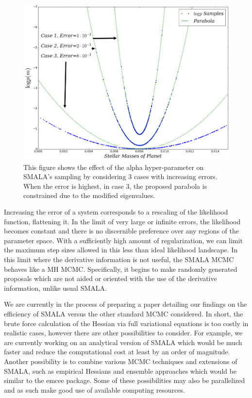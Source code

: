 \begin{figure}
\centering
\includegraphics[width=0.75\hsize]{alpha-1.png}
   \caption{This figure shows the effect of the alpha hyper-parameter on SMALA's sampling by considering 3 cases with increasing errors. When the error is highest, in case 3, the proposed parabola is constrained due to the modified eigenvalues.
}
      \label{alpha}
\end{figure}

Increasing the error of a system corresponds to a rescaling of the likelihood function, flattening it.
In the limit of very large or infinite errors, the likelihood becomes constant and there is no discernible preference over any regions of the parameter space.
With a sufficiently high amount of regularization, we can limit the maximum step sizes allowed in this less than ideal likelihood landscape.
In this limit where the derivative information is not useful, the SMALA MCMC behaves like a MH MCMC.
Specifically, it begins to make randomly generated proposals which are not aided or oriented with the use of the derivative information, unlike usual SMALA.


We are currently in the process of preparing a paper detailing our findings on the efficiency of SMALA versus the other standard MCMC considered.
In short, the brute force calculation of the Hessian via full variational equations is too costly in realistic cases, however there are other possibilities to consider.
For example, we are currently working on an analytical version of SMALA which would be much faster and reduce the computational cost at least by an order of magnitude.
Another possibility is to combine various MCMC techniques and extensions of SMALA, such as empirical Hessians \cite{papamarkou2016manifold} and ensemble approaches \cite{arampatzis2016langevin} which would be similar to the emcee package. 
Some of these possibilities may also be parallelized and as such make good use of available computing resources.

